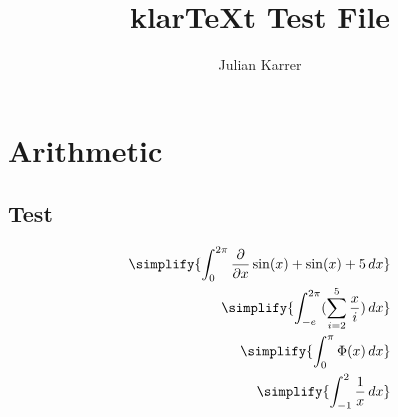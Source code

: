 \documentclass[oneside, a4paper]{article}
\author{Julian Karrer}
\title{klarTeXt Test File}
\begin{document}
\maketitle

\section*{Arithmetic}

\subsection*{Test}
\begin{program}
    \begin{align*}
        \simplify{\int_{0}^{2\pi} {\ddx{x}\sin(x)} + \sin(x) + 5 \,dx} \\
        \simplify{\int_{-e}^{2\pi} (\sum_{i=2}^{5} \frac{x}{i})\,dx}   \\
        \simplify{\int_{0}^{\pi} \Phi(x) \,dx}                         \\
        \simplify{\int_{-1}^{2} \frac{1}{x} \,dx}                      \\
    \end{align*}
\end{program}
\end{document}
